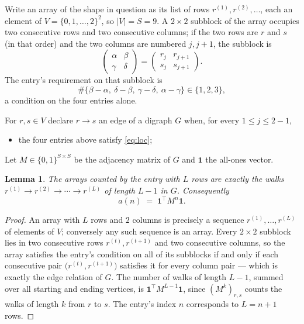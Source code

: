 \documentclass[11pt,a4paper]{article}
\theoremstyle{plain}
\newtheorem{lemma}[theorem]{Lemma}
\theoremstyle{definition}
\begin{document}
Write an array of the shape in question as its list of rows
$r^{(1)},r^{(2)},\dots$, each an element of
$V=\{0,1,\dots,2\}^{2}$, so $|V|=S=9$. A $2\times2$ subblock of the array
occupies two consecutive rows and two consecutive columns; if the two rows are $r$
and $s$ (in that order) and the two columns are numbered $j,j+1$,
the subblock is
\[
\begin{pmatrix}\alpha&\beta\\\gamma&\delta\end{pmatrix}=\begin{pmatrix}r_j&r_{j+1}\\s_j&s_{j+1}\end{pmatrix}.
\]
The entry's requirement on that subblock is
\begin{equation}\label{eq:loc}
\#\{\beta-\alpha,\ \delta-\beta,\ \gamma-\delta,\ \alpha-\gamma\}\in\{1,2,3\},
\end{equation}
a condition on the four entries alone.

For $r,s\in V$ declare $r\to s$ an edge of a digraph $G$ when, for every
$1\le j\le 2-1$,
\begin{itemize}
\item the four entries above satisfy \eqref{eq:loc};

\end{itemize}
Let $M\in\{0,1\}^{S\times S}$ be the adjacency matrix of $G$ and $\mathbf{1}$ the
all-ones vector.

\begin{lemma}\label{lem:walk}
The arrays counted by the entry with $L$ rows are exactly the walks
$r^{(1)}\to r^{(2)}\to\cdots\to r^{(L)}$ of length $L-1$ in $G$. Consequently
\[
a(n)\;=\;\mathbf{1}^{\!\top}M^{n}\mathbf{1} .
\]
\end{lemma}

\begin{proof}
An array with $L$ rows and $2$ columns is precisely a sequence
$r^{(1)},\dots,r^{(L)}$ of elements of $V$; conversely any such sequence is an array.
Every $2\times2$ subblock lies in two consecutive rows $r^{(t)},r^{(t+1)}$ and two
consecutive columns, so the array satisfies the entry's condition on all of its subblocks
if and only if each consecutive pair $\bigl(r^{(t)},r^{(t+1)}\bigr)$ satisfies it for
every column pair --- which is exactly the edge relation of $G$. The number of walks of
length $L-1$, summed over all starting and ending vertices, is
$\mathbf{1}^{\!\top}M^{L-1}\mathbf{1}$, since $(M^{k})_{r,s}$ counts the walks of
length $k$ from $r$ to $s$. The entry's index $n$ corresponds to $L=n+1$ rows.
\end{proof}
\end{document}
